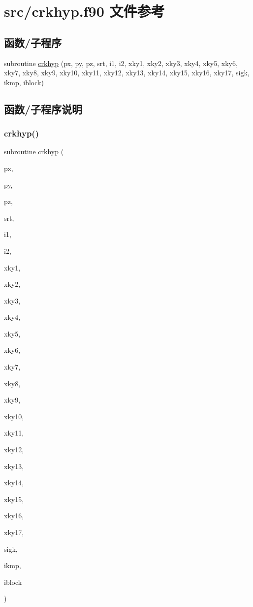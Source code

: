 \hypertarget{crkhyp_8f90}{}\section{src/crkhyp.f90 文件参考}
\label{crkhyp_8f90}
\subsection*{函数/子程序}
\begin{DoxyCompactItemize}
\item 
subroutine \mbox{\hyperlink{crkhyp_8f90_a3cee9184ff3be381c1a195e301ef0ffa}{crkhyp}} (px, py, pz, srt, i1, i2, xky1, xky2, xky3, xky4, xky5, xky6, xky7, xky8, xky9, xky10, xky11, xky12, xky13, xky14, xky15, xky16, xky17, sigk, ikmp, iblock)
\end{DoxyCompactItemize}


\subsection{函数/子程序说明}
\mbox{\label{crkhyp_8f90_a3cee9184ff3be381c1a195e301ef0ffa}} 
\subsubsection{\texorpdfstring{crkhyp()}{crkhyp()}}
{\footnotesize\ttfamily subroutine crkhyp (\begin{DoxyParamCaption}\item[{}]{px,  }\item[{}]{py,  }\item[{}]{pz,  }\item[{}]{srt,  }\item[{}]{i1,  }\item[{}]{i2,  }\item[{}]{xky1,  }\item[{}]{xky2,  }\item[{}]{xky3,  }\item[{}]{xky4,  }\item[{}]{xky5,  }\item[{}]{xky6,  }\item[{}]{xky7,  }\item[{}]{xky8,  }\item[{}]{xky9,  }\item[{}]{xky10,  }\item[{}]{xky11,  }\item[{}]{xky12,  }\item[{}]{xky13,  }\item[{}]{xky14,  }\item[{}]{xky15,  }\item[{}]{xky16,  }\item[{}]{xky17,  }\item[{}]{sigk,  }\item[{}]{ikmp,  }\item[{}]{iblock }\end{DoxyParamCaption})}



